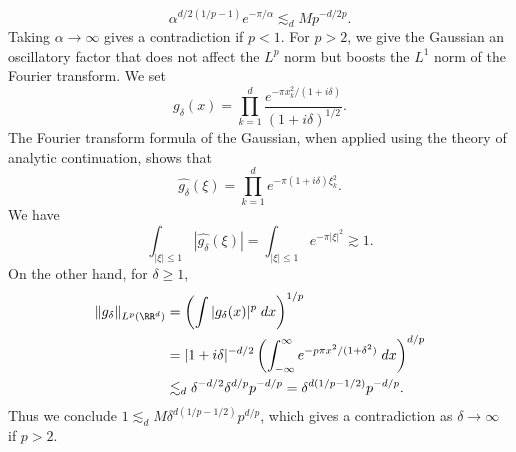 \begin{example}
  \[ \alpha^{d/2(1/p-1)} e^{-\pi/\alpha} \lesssim_d M p^{-d/2p}. \]
  Taking $\alpha \to \infty$ gives a contradiction if $p < 1$. For $p > 2$, we give the Gaussian an oscillatory factor that does not affect the $L^p$ norm but boosts the $L^1$ norm of the Fourier transform. We set
  \[ g_\delta(x) = \prod_{k = 1}^d \frac{e^{- \pi x_k^2 / (1 + i \delta)}}{(1 + i \delta)^{1/2}}. \]
  The Fourier transform formula of the Gaussian, when applied using the theory of analytic continuation, shows that
  \[ \widehat{g_\delta}(\xi) = \prod_{k = 1}^d e^{- \pi (1 + i \delta) \xi_k^2}. \]
  We have
  \[ \int_{|\xi| \leq 1} |\widehat{g_\delta}(\xi)| = \int_{|\xi| \leq 1} e^{- \pi |\xi|^2} \gtrsim 1. \]
  On the other hand, for $\delta \geq 1$,
  \begin{align*}
    \| g_\delta \|_{L^p(\RR^d)} &= \left( \int |g_\delta(x)|^p\; dx \right)^{1/p}\\
    &= |1 + i \delta|^{-d/2} \left( \int_{-\infty}^\infty e^{- p \pi x^2/(1 + \delta^2)}\; dx \right)^{d/p}\\
    &\lesssim_d \delta^{-d/2} \delta^{d/p} p^{-d/p} = \delta^{d(1/p - 1/2)} p^{-d/p}.
  \end{align*}
  Thus we conclude $1 \lesssim_d M \delta^{d(1/p - 1/2)} p^{d/p}$, which gives a contradiction as $\delta \to \infty$ if $p > 2$.
\end{example}

